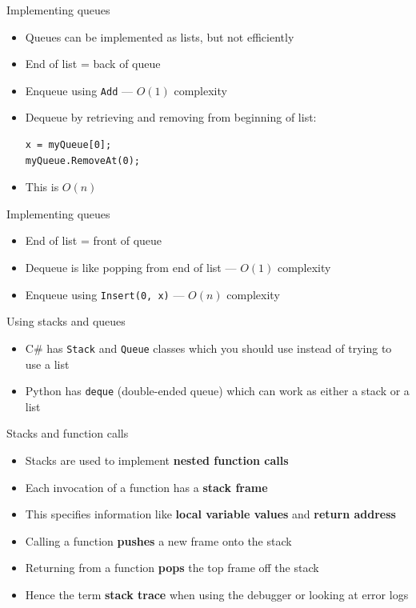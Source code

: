 \begin{frame}[fragile]{Implementing queues}
	\begin{itemize}
		\pause\item Queues can be implemented as lists, but not efficiently
		\pause\item End of list = back of queue
		\pause\item Enqueue using \lstinline{Add} --- $O(1)$ complexity
		\pause\item Dequeue by retrieving and removing from beginning of list:
			\begin{lstlisting}
x = myQueue[0];
myQueue.RemoveAt(0);
			\end{lstlisting}
		\pause\item This is $O(n)$
	\end{itemize}
\end{frame}

\begin{frame}[fragile]{Implementing queues}
	\begin{itemize}
		\pause\item End of list = front of queue
		\pause\item Dequeue is like popping from end of list --- $O(1)$ complexity
		\pause\item Enqueue using \lstinline{Insert(0, x)} --- $O(n)$ complexity
	\end{itemize}
\end{frame}

\begin{frame}{Using stacks and queues}
	\begin{itemize}
		\pause\item C\# has \lstinline{Stack} and \lstinline{Queue} classes which you should use instead of trying to use a list
		\pause\item Python has \lstinline{deque} (double-ended queue) which can work as either a stack or a list
	\end{itemize}
\end{frame}

\begin{frame}{Stacks and function calls}
	\begin{itemize}
		\pause\item Stacks are used to implement \textbf{nested function calls}
		\pause\item Each invocation of a function has a \textbf{stack frame}
		\pause\item This specifies information like \textbf{local variable values} and \textbf{return address}
		\pause\item Calling a function \textbf{pushes} a new frame onto the stack
		\pause\item Returning from a function \textbf{pops} the top frame off the stack
		\pause\item Hence the term \textbf{stack trace} when using the debugger or looking at error logs
	\end{itemize}
\end{frame}

